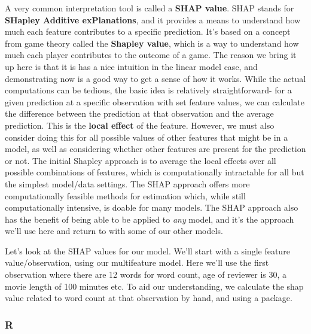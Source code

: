 \documentclass[
  letterpaper,
]{krantz}
\begin{document}
A very common interpretation tool is called a \textbf{SHAP value}. SHAP
stands for \textbf{SHapley Additive exPlanations}, and it provides a
means to understand how much each feature contributes to a specific
prediction. It's based on a concept from game theory called the
\textbf{Shapley value}, which is a way to understand how much each
player contributes to the outcome of a game. The reason we bring it up
here is that it is has a nice intuition in the linear model case, and
demonstrating now is a good way to get a sense of how it works. While
the actual computations can be tedious, the basic idea is relatively
straightforward- for a given prediction at a specific observation with
set feature values, we can calculate the difference between the
prediction at that observation and the average prediction. This is the
\textbf{local effect} of the feature. However, we must also consider
doing this for all possible values of other features that might be in a
model, as well as considering whether other features are present for the
prediction or not. The initial Shapley approach is to average the local
effects over all possible combinations of features, which is
computationally intractable for all but the simplest model/data
settings. The SHAP approach offers more computationally feasible methods
for estimation which, while still computationally intensive, is doable
for many models. The SHAP approach also has the benefit of being able to
be applied to \emph{any} model, and it's the approach we'll use here and
return to with some of our other models.

Let's look at the SHAP values for our model. We'll start with a single
feature value/observation, using our multifeature model. Here we'll use
the first observation where there are 12 words for word count, age of
reviewer is 30, a movie length of 100 minutes etc. To aid our
understanding, we calculate the shap value related to word count at that
observation by hand, and using a package.

\subsubsection{R}
\end{document}
